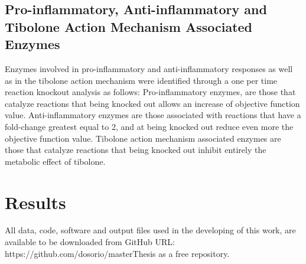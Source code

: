 \subsection*{Pro-inflammatory, Anti-inflammatory and Tibolone Action Mechanism Associated Enzymes}
Enzymes involved in pro-inflammatory and anti-inflammatory responses as well as in the tibolone action mechanism were identified through a one per time reaction knockout analysis as follows: Pro-inflammatory enzymes, are those that catalyze reactions that being knocked out allows an increase of objective function value. Anti-inflammatory enzymes are those associated with reactions that have a fold-change greatest equal to 2, and at being knocked out reduce even more the objective function value. Tibolone action mechanism associated enzymes are those that catalyze reactions that being knocked out inhibit entirely the metabolic effect of tibolone.

\section{Results}
All data, code, software and output files used in the developing of this work, are available to be downloaded from GitHub URL: https://github.com/dosorio/masterThesis as a free repository.

